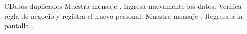 	\begin{UCtrayectoriaA}{C}{Datos duplicados}
		\UCpaso[\UCsist] Muestra mensaje .
			\UCpaso[\UCactor] Ingresa nuevamente los datos.
			\UCpaso[\UCsist] Verifica regla de negocio  y registra el nuevo personal. 
		\UCpaso[\UCsist] Muestra mensaje .
		\UCpaso[\UCsist] Regresa a la pantalla .
	\end{UCtrayectoriaA}